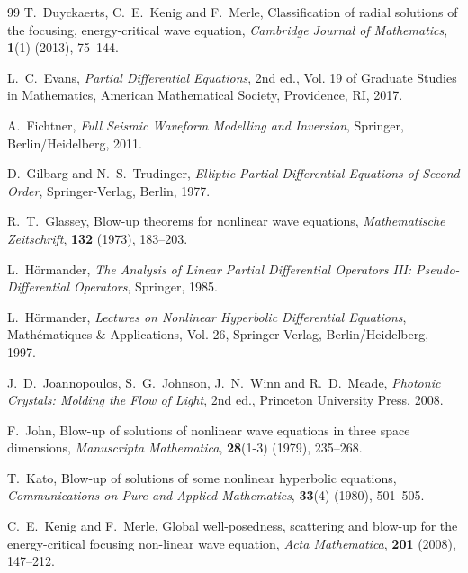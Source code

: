 \documentclass[11pt,reqno,oneside]{amsart}
\numberwithin{equation}{section}
\theoremstyle{definition}
\theoremstyle{remark}
\numberwithin{equation}{section}
\begin{document}
\begin{thebibliography}{99}
	T.~Duyckaerts, C.~E.~Kenig and F.~Merle, 
	Classification of radial solutions of the focusing, energy-critical wave equation, 
	\textit{Cambridge Journal of Mathematics}, 
	\textbf{1}(1) (2013), 75--144.
	
	L.~C.~Evans, 
	\textit{Partial Differential Equations}, 
	2nd ed., Vol. 19 of Graduate Studies in Mathematics, 
	American Mathematical Society, Providence, RI, 2017.
	
	A.~Fichtner, 
	\textit{Full Seismic Waveform Modelling and Inversion}, 
	Springer, Berlin/Heidelberg, 2011.
	
	D.~Gilbarg and N.~S.~Trudinger, 
	\textit{Elliptic Partial Differential Equations of Second Order}, 
	Springer-Verlag, Berlin, 1977.
	
	R.~T.~Glassey, 
	Blow-up theorems for nonlinear wave equations, 
	\textit{Mathematische Zeitschrift}, 
	\textbf{132} (1973), 183--203.
	
	L.~H\"ormander, 
	\textit{The Analysis of Linear Partial Differential Operators III: Pseudo-Differential Operators}, 
	Springer, 1985.
	
	L.~H\"ormander, 
	\textit{Lectures on Nonlinear Hyperbolic Differential Equations}, 
	Math\'ematiques \& Applications, Vol. 26, 
	Springer-Verlag, Berlin/Heidelberg, 1997.
	
	
	J.~D.~Joannopoulos, S.~G.~Johnson, J.~N.~Winn and R.~D.~Meade, 
	\textit{Photonic Crystals: Molding the Flow of Light}, 
	2nd ed., 
	Princeton University Press, 2008.
	
	F.~John, 
	Blow-up of solutions of nonlinear wave equations in three space dimensions, 
	\textit{Manuscripta Mathematica}, 
	\textbf{28}(1-3) (1979), 235--268.
	
	T.~Kato, 
	Blow-up of solutions of some nonlinear hyperbolic equations, 
	\textit{Communications on Pure and Applied Mathematics}, 
	\textbf{33}(4) (1980), 501--505.
	
	C.~E.~Kenig and F.~Merle, 
	Global well-posedness, scattering and blow-up for the energy-critical focusing non-linear wave equation, 
	\textit{Acta Mathematica}, 
	\textbf{201} (2008), 147--212.
	

\end{thebibliography}
\end{document}
